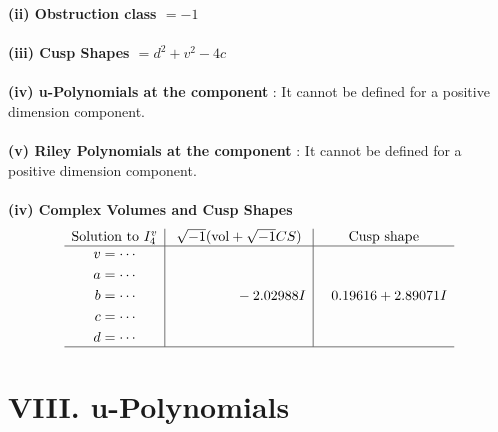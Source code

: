 \documentclass[1p]{elsarticle_modified}
\theoremstyle{definition}
\newcommand{\I}{\sqrt{-1}}
\begin{document}
\flushleft \textbf{(ii) Obstruction class $= -1$}\\~\\
\flushleft \textbf{(iii) Cusp Shapes $= d^2+v^2-4 c$}\\~\\
\flushleft \textbf{(iv) u-Polynomials at the component} : It cannot be defined for a positive dimension component.\\~\\
\flushleft \textbf{(v) Riley Polynomials at the component} : It cannot be defined for a positive dimension component.\\~\\
\newpage\flushleft \textbf{(iv) Complex Volumes and Cusp Shapes}
$$\begin{array}{c|c|c} 
\text{Solution to }I^v_{4}& \I (\text{vol} + \sqrt{-1}CS) & \text{Cusp shape}\\
 \hline 
\begin{aligned}
v &= \cdots \\
a &= \cdots \\
b &= \cdots \\
c &= \cdots \\
d &= \cdots\end{aligned}
 & \phantom{-0.000000 } -2.02988 I & \phantom{-}0.19616 + 2.89071 I\\
 \hline 
 \end{array}
$$
\newpage\renewcommand{\arraystretch}{1}
\centering \section*{ VIII. u-Polynomials}
\end{document}
